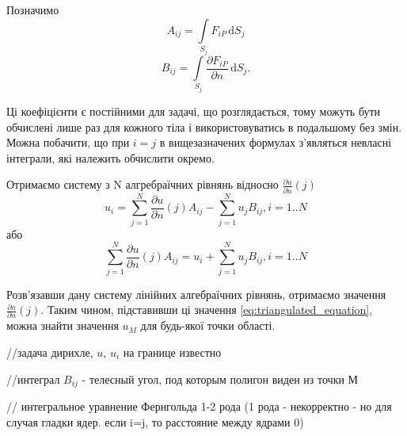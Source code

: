 \documentclass[a4paper,12pt]{article}
\begin{document}
Позначимо
\[A_{ij} = \int\limits_{S_j} F_{iP} \, \mathrm{d}S_j\]
\[B_{ij} = \int\limits_{S_j} \frac{\partial F_{iP}}{\partial n} \, \mathrm{d}S_j.\]

Ці коефіцієнти є постійними для задачі, що розглядається, тому можуть бути обчислені лише раз для кожного тіла і використовуватись в подальшому без змін. Можна побачити, що при $i = j$ в вищезазначених формулах з’являться невласні інтеграли, які належить обчислити окремо.

Отримаємо систему з N алгребраїчних рівнянь відносно $\frac{\partial u}{\partial n}(j)$
\[
u_i = \sum_{j=1}^{N} \frac{\partial u}{\partial n}(j) A_{ij} - \sum_{j=1}^{N} u_j B_{ij}, i = 1..N
\]
або
\[
\sum_{j=1}^{N} \frac{\partial u}{\partial n}(j) A_{ij} = u_i + \sum_{j=1}^{N} u_j B_{ij}, i = 1..N
\]

Розв’язавши дану систему лінійних алгебраїчних рівнянь, отримаємо значення $\frac{\partial u}{\partial n}(j)$. Таким чином, підставивши ці значення \ref{eq:triangulated_equation}, можна знайти значення $u_M$ для будь-якої точки області.

//задача дирихле, $u$, $u_i$ на границе известно

//интеграл $B_{ij}$ - телесный угол, под которым полигон виден из точки М

// интегральное уравнение Фернгольда 1-2 рода (1 рода - некорректно - но для случая гладки ядер. если i=j, то расстояние между ядрами 0)
\end{document}
